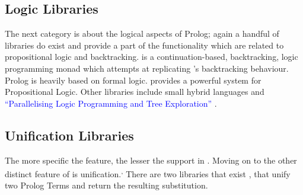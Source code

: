 \documentclass[thesis-solanki.tex]{subfiles}
\begin{document}
\begin{comment}
\begin{enumerate}
	\item Nano Prolog
	\item Prolog
	\item cspm-To-Prolog
	\item prolog-graph and prolog-graph-lib
	\item hswip,
	\\* \url{https://groups.google.com/forum/#!topic/haskell-cafe/3vmCuw7NlWE}
\end{enumerate}
\end{comment}

\subsection{Logic Libraries}

  The next category is about the logical aspects of Prolog; again a handful of libraries do exist and provide a
  part of the functionality which are related
  to propositional logic and backtracking.
  \cite{logict-lib} is a continuation-based, backtracking, logic programming monad which attempts at replicating
  's
  backtracking behaviour.
  Prolog is heavily based on formal logic.
  \cite{proplogic-lib} provides a powerful system for Propositional Logic.
  Other libraries
  include small hybrid languages \cite{cflp-lib} and
  \textcolor{blue}{``Parallelising Logic Programming and Tree Exploration''}
  \cite{logic-grows-on-trees-lib}.


\subsection{Unification Libraries}

The more specific the feature{\Large,} the lesser the support in .
Moving on to the other distinct feature of  is unification.\textsuperscript{,}
There are two libraries that exist \cite{unification-fd-lib},
\cite{cmu-lib} that unify two Prolog Terms and return the resulting substitution.
\end{document}

